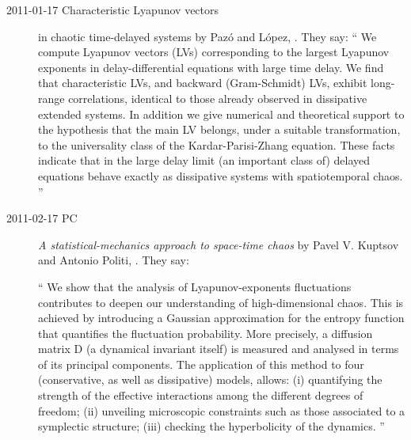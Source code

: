 \begin{description}
\item[2011-01-17 Characteristic {Lyapunov} vectors]
in chaotic time-delayed systems
by Paz{\'o} and L{\'o}pez,
. They say:
``
We compute Lyapunov vectors (LVs) corresponding to the largest Lyapunov
exponents in delay-differential equations with large time delay. We find
that characteristic LVs, and backward (Gram-Schmidt) LVs, exhibit
long-range correlations, identical to those already observed in
dissipative extended systems. In addition we give numerical and
theoretical support to the hypothesis that the main LV belongs, under a
suitable transformation, to the universality class of the
Kardar-Parisi-Zhang equation. These facts indicate that in the large
delay limit (an important class of) delayed equations behave exactly as
dissipative systems with spatiotemporal chaos.
''
\item[2011-02-17 PC]
\emph{A statistical-mechanics approach to space-time chaos}
by  Pavel V. Kuptsov and Antonio Politi,
. They say:

``
We show that the analysis of Lyapunov-exponents fluctuations
contributes to deepen our understanding of high-dimensional chaos. This is
achieved by introducing a Gaussian approximation for the entropy function that
quantifies the fluctuation probability. More precisely, a diffusion matrix D (a
dynamical invariant itself) is measured and analysed in terms of its principal
components. The application of this method to four (conservative, as well as
dissipative) models, allows: (i) quantifying the strength of the effective
interactions among the different degrees of freedom; (ii) unveiling microscopic
constraints such as those associated to a symplectic structure; (iii) checking
the hyperbolicity of the dynamics.
''

\end{description}



\renewcommand{\ssp}{a}
